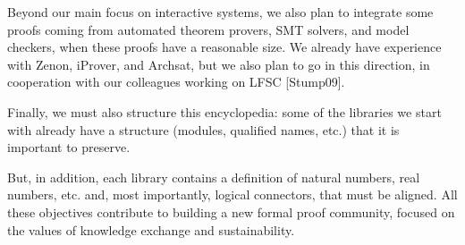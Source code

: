 Beyond our main focus on interactive systems, we also plan to
integrate some proofs coming from automated theorem provers, SMT
solvers, and model checkers, when these proofs have a reasonable
size. We already have experience with Zenon, iProver, and Archsat, but
we also plan to go in this direction, in cooperation with our
colleagues working on LFSC [Stump09].

Finally, we must also structure this encyclopedia: some of the
libraries we start with already have a structure (modules, qualified
names, etc.) that it is important to preserve.

But, in addition, each library contains a definition of natural
numbers, real numbers, etc. and, most importantly, logical connectors,
that must be aligned.  All these objectives contribute to building a
new formal proof community, focused on the values of knowledge
exchange and sustainability.



